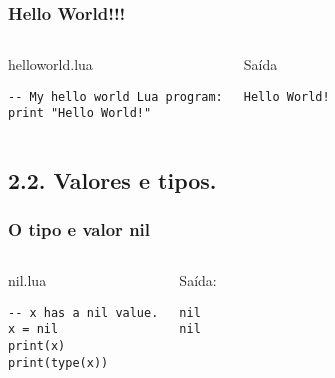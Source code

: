 \documentclass[brazil]{beamer}
\begin{document}
\begin{frame}[fragile]
  \frametitle{Hello World!!!}
  \pause
  \begin{columns}
      \begin{block}{helloworld.lua}
        \begin{lstlisting}
-- My hello world Lua program:
print "Hello World!"
        \end{lstlisting}
      \end{block}
    \pause
      \begin{block}{Saída}
        \begin{verbatim}
Hello World!  \end{verbatim}
      \end{block}
  \end{columns}
\end{frame}

  \subsection{2.2. Valores e tipos.}



\begin{frame}[fragile]
  \frametitle{O tipo e valor nil}
  \pause
  \begin{columns}
      \begin{block}{nil.lua}
        \begin{lstlisting}
-- x has a nil value.
x = nil
print(x)
print(type(x))
        \end{lstlisting}
      \end{block}
    \pause
      \begin{block}{Saída:}
        \begin{verbatim}
nil
nil     \end{verbatim}
      \end{block}
  \end{columns}
\end{frame}
\end{document}
